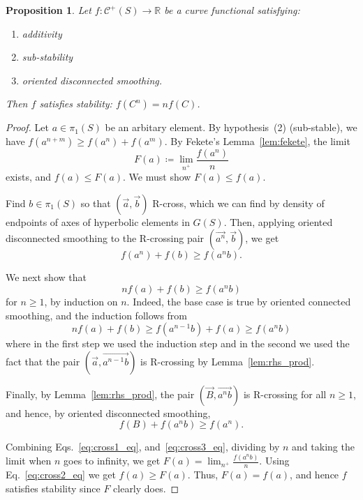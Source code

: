\documentclass[11pt]{amsart}
\newcommand{\ora}[1]{\overrightarrow{#1}}
\numberwithin{equation}{section}
\numberwithin{figure}{section}
\newtheorem{proposition}[theorem]{Proposition}
\theoremstyle{definition}
\theoremstyle{plain}
\newcommand{\Curves}{\mathcal{C}}
\begin{document}
\begin{proposition}
Let $f \colon \Curves^+(S) \to \mathbb{R}$ be a curve functional satisfying:
\begin{enumerate}
\item additivity
\item sub-stability
\item oriented disconnected smoothing.
\end{enumerate}
Then $f$ satisfies stability: $f(C^n) = nf(C)$.
\label{prop:power_disconnected_imply_stable}
\end{proposition}
\begin{proof}
  Let $a \in \pi_1(S)$ be an arbitary element.
By hypothesis~(2)
(sub-stable), we have $f(a^{n+m}) \geq f(a^n) + f(a^m)$.
By Fekete's Lemma~\ref{lem:fekete}, the limit
\[
F(a)\coloneqq\lim_{n^+} \frac{f(a^n)}{n}
\]
exists, and $f(a) \leq F(a)$. We must show $F(a) \leq f(a)$.
  
  Find $b \in
\pi_1(S)$ so that $(\ora{a},\ora{b})$ R-cross, which we can find by
density of endpoints of axes of hyperbolic elements in $G(S)$.
Then, applying oriented disconnected smoothing to the R-crossing pair $(\ora{a^n}, \ora{b})$, we get
\begin{equation}
f(a^n) + f(b) \geq f(a^nb).
\label{eq:cross1_eq}
\end{equation}

We next show that
\begin{equation}
nf(a) + f(b) \geq f(a^nb)
\label{eq:cross2_eq}
\end{equation}
for $n\geq 1$, by induction on $n$.
Indeed, the base case is true by oriented connected smoothing, and the
induction follows from
\[
nf(a) + f(b) \geq f(a^{n-1}b) + f(a) \geq f(a^nb)
\]
where in the first step we used the induction step and in the second we used the fact that the pair $(\ora{a},\ora{a^{n-1}b})$ is R-crossing by Lemma~\ref{lem:rhs_prod}.

Finally, by Lemma~\ref{lem:rhs_prod}, the pair $(\ora{B},\ora{a^nb})$
is R-crossing for all $n \geq 1$, and hence, by oriented disconnected
smoothing,
\begin{equation}
f(B) + f(a^nb) \geq f(a^n).
\label{eq:cross3_eq}
\end{equation}

Combining Eqs.~\eqref{eq:cross1_eq}, and~\eqref{eq:cross3_eq},
dividing by $n$ and taking the limit when $n$ goes to infinity, we get
$F(a)=\lim_{n^+} \frac{f(a^nb)}{n}$. Using Eq.~\eqref{eq:cross2_eq}
we get $f(a) \geq F(a)$. Thus, $F(a)=f(a)$, and hence $f$ satisfies stability since $F$ clearly does.
\end{proof}
\end{document}
